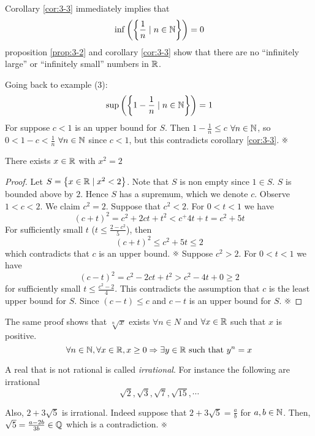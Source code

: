 \documentclass{article}
\begin{document}
Corollary \ref{cor:3-3} immediately implies that
\[
    \inf \left( \left\{ \frac{1}{n} \mid n \in \mathbb{N} \right\} \right) = 0
\]
proposition \ref{prop:3-2} and corollary \ref{cor:3-3} show that there are no ``infinitely large'' or ``infinitely small'' numbers in $\mathbb{R}$.

Going back to example (3):
\[
    \sup \left( \left\{ 1 - \frac{1}{n} \mid n \in \mathbb{N} \right\} \right) = 1
\]
For suppose $c < 1$ is an upper bound for $S$. Then $1 - \frac{1}{n} \leq c$ $\forall n \in \mathbb{N}$,
so $0 < 1 - c < \frac{1}{n}$ $\forall n \in \mathbb{N}$ since $c < 1$, but this contradicts corollary \ref{cor:3-3}. $\contradiction$

\begin{nthm}
    There exists $x \in \mathbb{R}$ with $x^2 = 2$
\end{nthm}
\begin{proof}
    Let $S = \left\{ x \in \mathbb{R} \mid x^2 < 2 \right\}$.
    Note that $S$ is non empty since $1 \in S$. $S$ is bounded above by $2$.
    Hence $S$ has a supremum, which we denote $c$.
    Observe $1 < c < 2$. We claim $c^2 = 2$.
    Suppose that $c^2 < 2$.
    For $0 < t < 1$ we have
    \[
        (c + t)^2 = c^2 + 2ct + t^2 < c^ + 4t + t = c^2 + 5t  
    \]
    For sufficiently small $t$ ($t \leq \frac{2 - c^2}{5}$), then
    \[
        (c + t)^2 \leq c^2 + 5t \leq 2  
    \]
    which contradicts that $c$ is an upper bound. $\contradiction$
    Suppose $c^2 > 2$. For $0 < t < 1$ we have
    \[
        (c - t)^2 = c^2 - 2ct + t^2 > c^2 - 4t + 0 \geq 2  
    \]
    for sufficiently small $t \leq \frac{c^2 - 2}{4}$.
    This contradicts the assumption that $c$ is the least upper bound for $S$.
    Since $(c - t) \leq c$ and $c - t$ is an upper bound for $S$. $\contradiction$
\end{proof}

\begin{remark}
    The same proof shows that $\sqrt[n]{x}$ exists $\forall n \in N$ and $\forall x \in \mathbb{R}$
    such that $x$ is positive.
    \[
        \forall n \in \mathbb{N}, \forall x \in \mathbb{R}, x \geq 0 \Rightarrow \exists y \in \mathbb{R} \text{ such that } y^n = x  
    \]
\end{remark}


\begin{defi}[Irrational]
    A real that is not rational is called \emph{irrational}.
    For instance the following are irrational 
    \[
        \sqrt{2}, \sqrt{3}, \sqrt{7}, \sqrt{15}, \cdots
    \]
\end{defi}
\begin{remark}
    Also, $2 + 3 \sqrt{5}$ is irrational.
    Indeed suppose that $2 + 3 \sqrt{5} = \frac{a}{b}$ for $a, b \in \mathbb{N}$.
    Then, $\sqrt{5} = \frac{a - 2b}{3b} \in \mathbb{Q}$ which is a contradiction. $\contradiction$ 
\end{remark}
\end{document}
